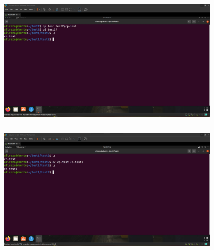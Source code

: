 \documentclass{article}
\begin{document}
\subsection{}
\begin{figure}[H]
    \centering
    \includegraphics[width=1.0\textwidth]{figures/3c.jpg}
    \caption
	{
	}
    \label{fig:fig1}
\end{figure}

\subsection{}
\begin{figure}[H]
    \centering
    \includegraphics[width=1.0\textwidth]{figures/3d.jpg}
    \caption
	{
	}
    \label{fig:fig1}
\end{figure}
\end{document}
